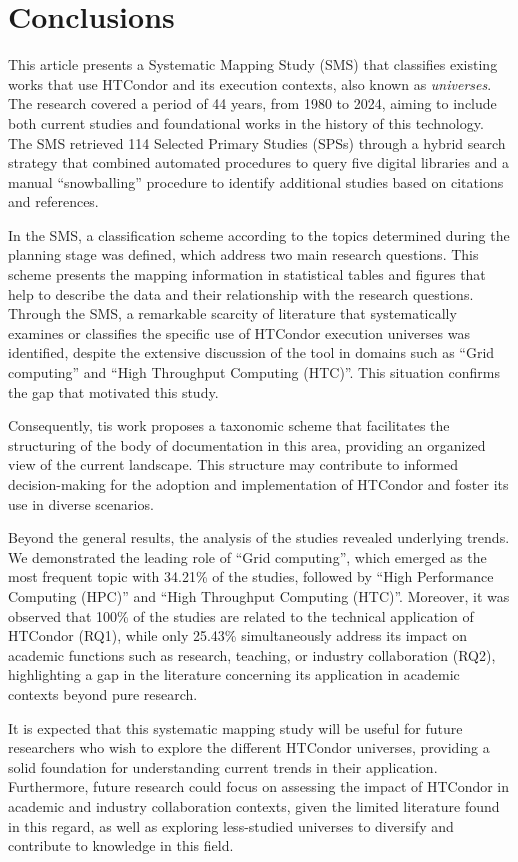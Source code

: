 \section{Conclusions}\label{sec:conclusiones}

This article presents a Systematic Mapping Study (SMS) that classifies existing works that use HTCondor and its execution contexts, also known as \textit{universes}. The research covered a period of 44 years, from 1980 to 2024, aiming to include both current studies and foundational works in the history of this technology. The SMS retrieved 114 Selected Primary Studies (SPSs) through a hybrid search strategy that combined automated procedures to query five digital libraries and a manual ``snowballing'' procedure to identify additional studies based on citations and references.

In the SMS, a classification scheme according to the topics determined during the planning stage was defined, which address two main research questions. This scheme presents the mapping information in statistical tables and figures that help to describe the data and their relationship with the research questions. Through the SMS, a remarkable scarcity of literature that systematically examines or classifies the specific use of HTCondor execution universes was identified, despite the extensive discussion of the tool in domains such as ``Grid computing'' and ``High Throughput Computing (HTC)''. This situation confirms the gap that motivated this study.

Consequently, tis work proposes a taxonomic scheme that facilitates the structuring of the body of documentation in this area, providing an organized view of the current landscape. This structure may contribute to informed decision-making for the adoption and implementation of HTCondor and foster its use in diverse scenarios.

Beyond the general results, the analysis of the studies revealed underlying trends. We demonstrated the leading role of ``Grid computing'', which emerged as the most frequent topic with 34.21\% of the studies, followed by ``High Performance Computing (HPC)'' and ``High Throughput Computing (HTC)''. Moreover, it was observed that 100\% of the studies are related to the technical application of HTCondor (RQ1), while only 25.43\% simultaneously address its impact on academic functions such as research, teaching, or industry collaboration (RQ2), highlighting a gap in the literature concerning its application in academic contexts beyond pure research.

It is expected that this systematic mapping study will be useful for future researchers who wish to explore the different HTCondor universes, providing a solid foundation for understanding current trends in their application. Furthermore, future research could focus on assessing the impact of HTCondor in academic and industry collaboration contexts, given the limited literature found in this regard, as well as exploring less-studied universes to diversify and contribute to knowledge in this field.